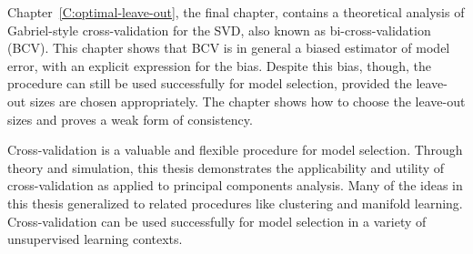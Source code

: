 Chapter~\ref{C:optimal-leave-out}, the final chapter, contains a theoretical analysis of Gabriel-style cross-validation for the SVD, also known as bi-cross-validation (BCV).  This chapter shows that BCV is in general a biased estimator of model error, with an explicit expression for the bias.  Despite this bias, though, the procedure can still be used successfully for model selection, provided the leave-out sizes are chosen appropriately.  The chapter shows how to choose the leave-out sizes and proves a weak form of consistency.

Cross-validation is a valuable and flexible procedure for model selection.  Through theory and simulation, this thesis demonstrates the applicability and utility of cross-validation as applied to principal components analysis.  Many of the ideas in this thesis generalized to related procedures like clustering and manifold learning.  Cross-validation can be used successfully for model selection in a variety of unsupervised learning contexts.
